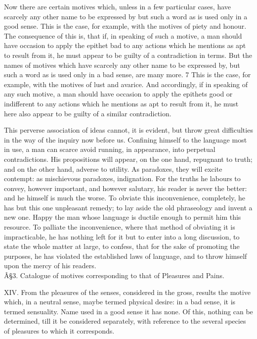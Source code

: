 \documentclass[12pt]{report}
\begin{document}
Now there are certain motives which, unless in a few particular cases,
have scarcely any other name to be expressed by but such a word as is
used only in a good sense. This is the case, for example, with the
motives of piety and honour. The consequence of this is, that if, in
speaking of such a motive, a man should have occasion to apply the
epithet bad to any actions which he mentions as apt to result from it,
he must appear to be guilty of a contradiction in terms. But the names
of motives which have scarcely any other name to be expressed by, but
such a word as is used only in a bad sense, are many more. 7 This is the
case, for example, with the motives of lust and avarice. And
accordingly, if in speaking of any such motive, a man should have
occasion to apply the epithets good or indifferent to any actions which
he mentions as apt to result from it, he must here also appear to be
guilty of a similar contradiction.

This perverse association of ideas cannot, it is evident, but throw
great difficulties in the way of the inquiry now before us. Confining
himself to the language most in use, a man can scarce avoid running, in
appearance, into perpetual contradictions. His propositions will appear,
on the one hand, repugnant to truth; and on the other hand, adverse to
utility. As paradoxes, they will excite contempt: as mischievous
paradoxes, indignation. For the truths he labours to convey, however
important, and however salutary, his reader is never the better: and he
himself is much the worse. To obviate this inconvenience, completely, he
has but this one unpleasant remedy; to lay aside the old phraseology and
invent a new one. Happy the man whose language is ductile enough to
permit him this resource. To palliate the inconvenience, where that
method of obviating it is impracticable, he has nothing left for it but
to enter into a long discussion, to state the whole matter at large, to
confess, that for the sake of promoting the purposes, he has violated
the established laws of language, and to throw himself upon the mercy of
his readers.\\

Â§3. Catalogue of motives corresponding to that of Pleasures and Pains.

XIV. From the pleasures of the senses, considered in the gross, results
the motive which, in a neutral sense, maybe termed physical desire: in a
bad sense, it is termed sensuality. Name used in a good sense it has
none. Of this, nothing can be determined, till it be considered
separately, with reference to the several species of pleasures to which
it corresponds.
\end{document}
